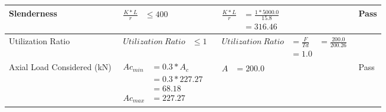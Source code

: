 \documentclass{article}%
\begin{document}
\begin{longtable}{|p{2.5cm}|p{4.5cm}|p{8cm}|p{1cm}|}
Slenderness&$\begin{aligned}\frac{K * L}{r} &\leq 400\end{aligned}$&$\begin{aligned}\frac{K * L}{r} &= \frac{1*5000.0}{15.8}\\ &= 316.46\end{aligned}$&Pass\\%
\hline%
Utilization Ratio&$\begin{aligned} Utilization~Ratio &\leq 1 \end{aligned}$&$\begin{aligned} Utilization~Ratio &= \frac{F}{Td}&=\frac{200.0}{200.26}\\ &= 1.0\end{aligned}$&\\%
\hline%
Axial Load Considered (kN)&$\begin{aligned} Ac_{min} &= 0.3 * A_c\\ &= 0.3 *227.27\\ &=68.18\\ Ac_{max} &=227.27\end{aligned}$&$\begin{aligned} A &=200.0\end{aligned}$&Pass\\%
\hline%
\end{longtable}

%
\newpage%
\end{document}
